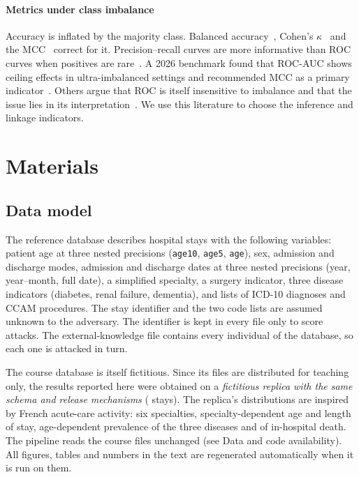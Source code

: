 \documentclass[preprint,12pt]{elsarticle}
\begin{document}
\paragraph{Metrics under class imbalance}
Accuracy is inflated by the majority class. Balanced accuracy~\cite{brodersen2010balanced}, Cohen's $\kappa$~\cite{cohen1960kappa} and the MCC~\cite{matthews1975,chicco2020mcc} correct for it. Precision--recall curves are more informative than ROC curves when positives are rare~\cite{saito2015prc}. A 2026 benchmark found that ROC-AUC shows ceiling effects in ultra-imbalanced settings and recommended MCC as a primary indicator~\cite{imani2026rocauc,chicco2023mccroc}. Others argue that ROC is itself insensitive to imbalance and that the issue lies in its interpretation~\cite{richardson2024roc}. We use this literature to choose the inference and linkage indicators.


\section{Materials}
\label{sec:materials}

\subsection{Data model}
The reference database describes hospital stays with the following variables: patient age at three nested precisions (\texttt{age10}, \texttt{age5}, \texttt{age}), sex, admission and discharge modes, admission and discharge dates at three nested precisions (year, year--month, full date), a simplified specialty, a surgery indicator, three disease indicators (diabetes, renal failure, dementia), and lists of ICD-10 diagnoses and CCAM procedures. The stay identifier and the two code lists are assumed unknown to the adversary. The identifier is kept in every file only to score attacks. The external-knowledge file contains every individual of the database, so each one is attacked in turn.

The course database is itself fictitious. Since its files are distributed for teaching only, the results reported here were obtained on a \emph{fictitious replica with the same schema and release mechanisms} (\Nrec{} stays). The replica's distributions are inspired by French acute-care activity: six specialties, specialty-dependent age and length of stay, age-dependent prevalence of the three diseases and of in-hospital death. The pipeline reads the course files unchanged (see Data and code availability). All figures, tables and numbers in the text are regenerated automatically when it is run on them.
\end{document}
